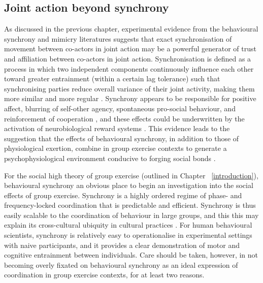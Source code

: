 \begin{CJK}{UTF8}{gbsn}
\subsection{Joint action beyond synchrony}
As discussed in the previous chapter, experimental evidence from the behavioural synchrony and mimicry literatures suggests that exact synchronisation of movement between co-actors in joint action may be a powerful generator of trust and affiliation between co-actors in joint action.  Synchronisation is defined as a process in which two independent components continuously influence each other toward greater entrainment (within a certain lag tolerance) such that synchronising parties reduce overall variance of their joint activity, making them more similar and more regular \citep{Pikovsky2007}.  Synchrony appears to be responsible for positive affect, blurring of self-other agency, spontaneous pro-social behaviour, and reinforcement of cooperation \citep{Mogan2017}, and these effects could be underwritten by the activation of neurobiological reward systems \citep{Tarr2016}.  This evidence leads to the suggestion that the effects of behavioural synchrony, in addition to those of physiological exertion, combine in group exercise contexts to generate a psychophysiological environment conducive to forging social bonds \citep{Cohen2017}.

For the social high theory of group exercise (outlined in Chapter ~\ref{introduction}), behavioural synchrony an obvious place to begin an investigation into the social effects of group exercise.  Synchrony is a highly ordered regime of phase- and frequency-locked coordination that is predictable and efficient. Synchrony is thus easily scalable to the coordination of behaviour in large groups, and this this may explain its cross-cultural ubiquity in cultural practices \citep{Dunbar2010,Tarr2016}.  For human behavioural scientists, synchrony is relatively easy to operationalise in experimental settings with naive participants, and it provides a clear demonstration of motor and cognitive entrainment between individuals.  Care should be taken, however, in not becoming overly fixated on behavioural synchrony as an ideal expression of coordination in group exercise contexts, for at least two reasons.







\end{CJK}
